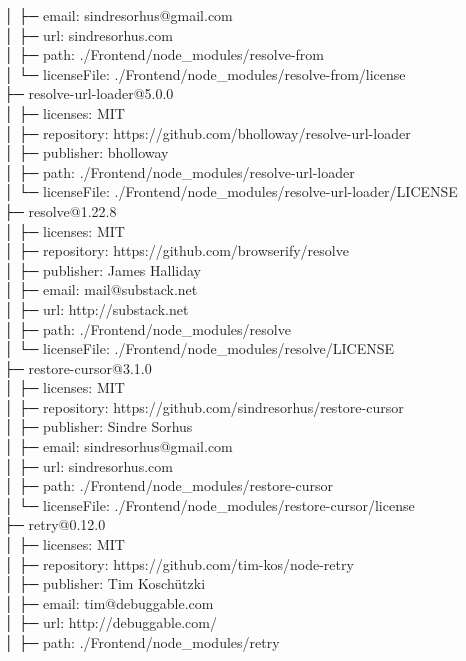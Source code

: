 │  ├─ email: sindresorhus@gmail.com\\
│  ├─ url: sindresorhus.com\\
│  ├─ path: ./Frontend/node\_modules/resolve-from\\
│  └─ licenseFile: ./Frontend/node\_modules/resolve-from/license\\
├─ resolve-url-loader@5.0.0\\
│  ├─ licenses: MIT\\
│  ├─ repository: https://github.com/bholloway/resolve-url-loader\\
│  ├─ publisher: bholloway\\
│  ├─ path: ./Frontend/node\_modules/resolve-url-loader\\
│  └─ licenseFile: ./Frontend/node\_modules/resolve-url-loader/LICENSE\\
├─ resolve@1.22.8\\
│  ├─ licenses: MIT\\
│  ├─ repository: https://github.com/browserify/resolve\\
│  ├─ publisher: James Halliday\\
│  ├─ email: mail@substack.net\\
│  ├─ url: http://substack.net\\
│  ├─ path: ./Frontend/node\_modules/resolve\\
│  └─ licenseFile: ./Frontend/node\_modules/resolve/LICENSE\\
├─ restore-cursor@3.1.0\\
│  ├─ licenses: MIT\\
│  ├─ repository: https://github.com/sindresorhus/restore-cursor\\
│  ├─ publisher: Sindre Sorhus\\
│  ├─ email: sindresorhus@gmail.com\\
│  ├─ url: sindresorhus.com\\
│  ├─ path: ./Frontend/node\_modules/restore-cursor\\
│  └─ licenseFile: ./Frontend/node\_modules/restore-cursor/license\\
├─ retry@0.12.0\\
│  ├─ licenses: MIT\\
│  ├─ repository: https://github.com/tim-kos/node-retry\\
│  ├─ publisher: Tim Koschützki\\
│  ├─ email: tim@debuggable.com\\
│  ├─ url: http://debuggable.com/\\
│  ├─ path: ./Frontend/node\_modules/retry\\

